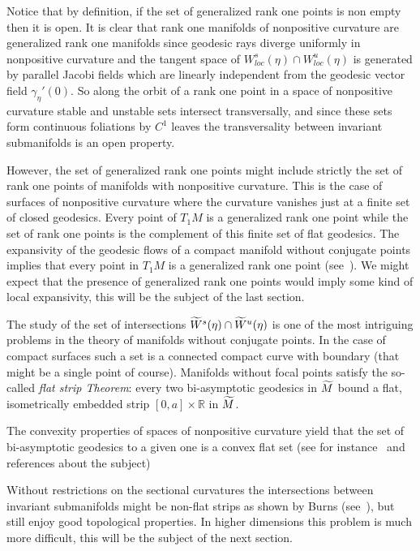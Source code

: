 \documentclass[AHL,Unicode,longabstracts,published]{cedram}
\newcommand{\bbR}{\mathbb{R}}
\let\oldtilde\tilde
\renewcommand*{\tilde}[1]{\mathchoice{\widetilde{#1}}{\widetilde{#1}}{\oldtilde{#1}}{\oldtilde{#1}}}
\begin{document}
Notice that by definition, if the set of generalized rank one points is non empty then it is open. It is clear that rank one manifolds of nonpositive curvature are generalized rank one manifolds since geodesic rays diverge uniformly in nonpositive curvature and the tangent space of $ W^{s}_{loc}(\eta) \cap W^{u}_{loc}(\eta)$ is generated by parallel Jacobi fields which are linearly independent from the geodesic vector field $\gamma_{\eta}'(0)$. So along the orbit of a rank one point in a space of nonpositive curvature stable and unstable sets intersect transversally, and since these sets form continuous foliations by $C^{1}$ leaves the transversality between invariant submanifolds is an open property.

However, the set of generalized rank one points might include strictly the set of rank one points of manifolds with nonpositive curvature. This is the case of surfaces of nonpositive curvature where the curvature vanishes just at a finite set of closed geodesics. Every point of $T_{1}M$ is a generalized rank one point while the set of rank one points is the complement of this finite set of flat geodesics. The expansivity of the geodesic flows of a compact manifold without conjugate points implies that every point in $T_{1}M$ is a generalized rank one point (see~\cite{kn:Ruggiero-expansive}). We might expect that the presence of generalized rank one points would imply some kind of local expansivity, this will be the subject of the last section.

The study of the set of intersections $\tilde{W}^{s}(\eta) \cap \tilde{W}^{u}(\eta)$ is one of the most intriguing problems in the theory of manifolds without conjugate points. In the case of compact surfaces such a set is a connected compact curve with boundary (that might be a single point of course). Manifolds without focal points satisfy the so-called \emph{flat strip Theorem}: every two bi-asymptotic geodesics in $\tilde{M}$ bound a flat, isometrically embedded strip $[0,a]\times \bbR$ in $\tilde{M}$.

The convexity properties of spaces of nonpositive curvature yield that the set of bi-asymptotic geodesics to a given one is a convex flat set (see for instance~\cite{kn:BGS} and references about the subject)

Without restrictions on the sectional curvatures the intersections between invariant submanifolds might be non-flat strips as shown by Burns (see~\cite{kn:Burns}), but still enjoy good topological properties. In higher dimensions this problem is much more difficult, this will be the subject of the next section.
\end{document}
